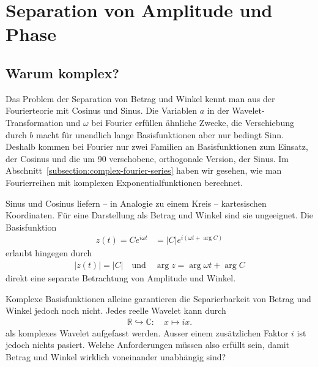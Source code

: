 \section{Separation von Amplitude und Phase}
\label{complex:separate}
\subsection{Warum komplex?}
Das Problem der Separation von Betrag und Winkel kennt man aus der Fourierteorie mit Cosinus und Sinus.
Die Variablen $a$ in der Wavelet-Transformation und $\omega$ bei Fourier erfüllen ähnliche Zwecke, die Verschiebung durch $b$ macht für unendlich lange Basisfunktionen aber nur bedingt Sinn.
Deshalb kommen bei Fourier nur zwei Familien an Basisfunktionen zum Einsatz, der Cosinus und die um 90\textdegree{} verschobene, orthogonale Version, der Sinus.
Im Abschnitt~\ref{subsection:complex-fourier-series} haben wir gesehen, wie man Fourierreihen mit komplexen Exponentialfunktionen berechnet.

Sinus und Cosinus liefern -- in Analogie zu einem Kreis -- kartesischen Koordinaten. 
Für eine Darstellung als Betrag und Winkel sind sie ungeeignet.
Die Basisfunktion
\begin{align*}
	z(t) = Ce^{i\omega t} &= |C|e^{i\left(\omega t + \arg C\right)}
\end{align*}
erlaubt hingegen durch 
\begin{align*}
	|z(t)| = |C| \quad \text{und}\quad
	\arg z = \arg \omega t + \arg C
\end{align*}
direkt eine separate Betrachtung von Amplitude und Winkel.

Komplexe Basisfunktionen alleine garantieren die Separierbarkeit von Betrag und Winkel jedoch noch nicht.
Jedes reelle Wavelet kann durch
\begin{align*}
	\mathbb{R} \hookrightarrow \mathbb{C} \colon \quad x \mapsto ix.
\end{align*}
als komplexes Wavelet aufgefasst werden.
Ausser einem zusätzlichen Faktor $i$ ist jedoch nichts pasiert.
Welche Anforderungen müssen also erfüllt sein, damit Betrag und Winkel wirklich voneinander unabhängig sind?

